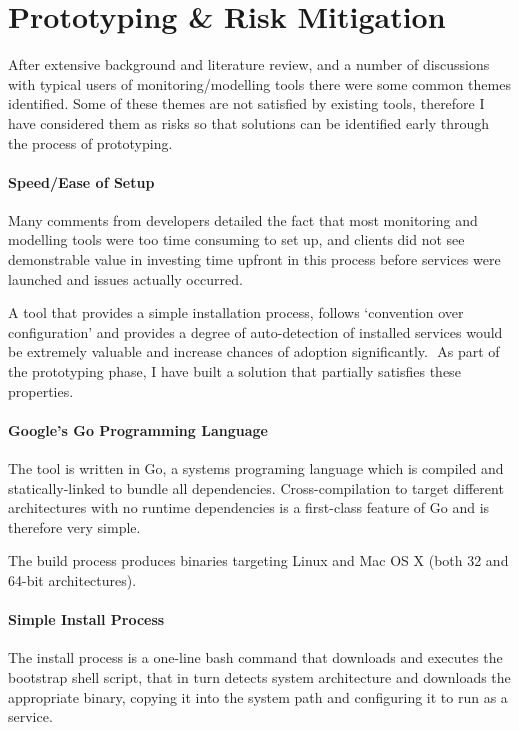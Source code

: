 \documentclass{cshonours}
\begin{document}
\section{Prototyping \& Risk Mitigation}

After extensive background and literature review, and a number of discussions with typical users of monitoring/modelling tools there were some common themes identified. Some of these themes are not satisfied by existing tools, therefore I have considered them as risks so that solutions can be identified early through the process of prototyping.

\paragraph{Speed/Ease of Setup} Many comments from developers detailed the fact that most monitoring and modelling tools were too time consuming to set up, and clients did not see demonstrable value in investing time upfront in this process before services were launched and issues actually occurred. 

A tool that provides a simple installation process, follows ‘convention over configuration’ and provides a degree of auto-detection of installed services would be extremely valuable and increase chances of adoption significantly.
 As part of the prototyping phase, I have built a solution that partially satisfies these properties.

\paragraph{Google's Go Programming Language} The tool is written in Go, a systems programing language which is compiled and statically-linked to bundle all dependencies. Cross-compilation to target different architectures with no runtime dependencies is a first-class feature of Go and is therefore very simple.

The build process produces binaries targeting Linux and Mac OS X (both 32 and 64-bit architectures). 

\paragraph{Simple Install Process} The install process is a one-line bash command that downloads and executes the bootstrap shell script, that in turn detects system architecture and downloads the appropriate binary, copying it into the system path and configuring it to run as a service.
\end{document}
